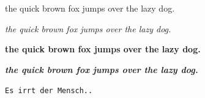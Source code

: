 \documentclass[a4paper,12pt]{article}
\begin{document}
\par the quick brown fox jumps over the lazy dog.
\par\textit{the quick brown fox jumps over the lazy dog.}
\par\textbf{the quick brown fox jumps over the lazy dog.}
\par\textbf{\textit{the quick brown fox jumps over the lazy dog.}}

\texttt{Es irrt der Mensch..}
\end{document}
